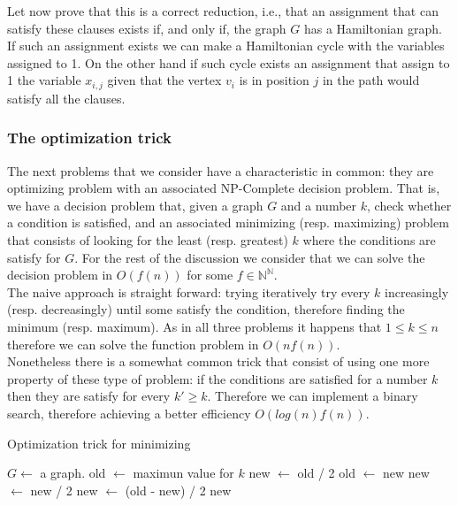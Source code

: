 Let now prove that this is a correct reduction, i.e., that an assignment that can satisfy these clauses exists if, and only if, the graph $G$ has a Hamiltonian graph. If such an assignment exists we can make a Hamiltonian cycle with the variables assigned to 1. On the other hand if such cycle exists an assignment that assign to 1 the variable $x_{i,j}$ given that the vertex $v_i$ is in position $j$ in the path would satisfy all the clauses. 

\subsubsection{The optimization trick}

The next problems that we consider have a characteristic in common: they are optimizing problem with an associated NP-Complete decision problem. That is, we have a decision problem that, given a graph $G$ and a number $k$, check whether a condition is satisfied, and an associated minimizing (resp. maximizing) problem that consists of looking for the least (resp. greatest) $k$ where the conditions are satisfy for $G$. For the rest of the discussion we consider that we can solve the decision problem in $O(f(n))$ for some $f\in \mathbb{N}^\mathbb{N}$. \\

The naive approach is straight forward: trying iteratively try every $k$ increasingly (resp. decreasingly) until some satisfy the condition, therefore finding the minimum (resp. maximum). As in all three problems it happens that $1\le k \le n$ therefore we can solve the function problem in $O(nf(n))$. \\

Nonetheless there is a somewhat common trick that consist of using one more property of these type of problem: if the conditions are satisfied for a number $k$ then they are satisfy for every $k' \ge k$. Therefore we can implement a binary search, therefore achieving a better efficiency $O(log(n)f(n))$.\\


\begin{algorithm}
  \caption{Optimization trick for minimizing}\label{bt}
  \begin{algorithmic}[1]
    \State $G \gets$ a graph.
    \State old $\gets$ maximun value for $k$
    \State new $\gets$ old / 2
         \State   old $\gets$ new
         \State   new $\gets$ new / 2
         \Else
         \State new $\gets$ (old - new) / 2
         \EndIf
    \EndWhile
    \State \Return new
  \end{algorithmic}
\end{algorithm}

